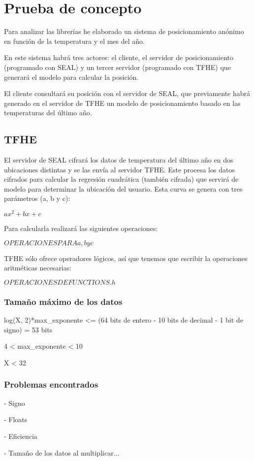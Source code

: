 \chapter{Prueba de concepto}

Para analizar las librerías he elaborado un sistema de posicionamiento anónimo en función de la temperatura y el mes del año. 

En este sistema habrá tres actores: el cliente, el servidor de posicionamiento (programado con SEAL) y un tercer servidor (programado con TFHE) que generará el modelo para calcular la posición.

El cliente consultará su posición con el servidor de SEAL, que previamente habrá generado en el servidor de TFHE un modelo de posicionamiento basado en las temperaturas del último año.


\section{TFHE}

El servidor de SEAL cifrará los datos de temperatura del último año en dos ubicaciones distintas y se las envía al servidor TFHE. Este procesa los datos cifrados para calcular la regresión cuadrática (también cifrada) que servirá de modelo para determinar la ubicación del usuario. Esta curva se genera con tres parámetros (a, b y c):

$ ax^2 + bx + c $

Para calcularla realizará las siguientes operaciones:

$ OPERACIONES PARA a, b y c $

TFHE sólo ofrece operadores lógicos, así que tenemos que escribir la operaciones aritméticas necesarias:

$ OPERACIONES DE FUNCTIONS.h $

\subsection{Tamaño máximo de los datos}

log(X, 2)*max_exponente <= (64 bits de entero - 10 bits de decimal - 1 bit de signo) = 53 bits

4 < max_exponente < 10

X < 32

\subsection{Problemas encontrados}

- Signo

- Floats

- Eficiencia


- Tamaño de los datos al multiplicar...

